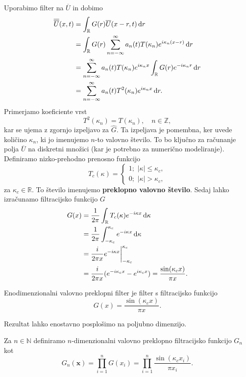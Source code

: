 \documentclass[mat2, tisk]{fmfdelo}
\newcommand{\R}{\mathbb R}
\newcommand{\N}{\mathbb N}
\newcommand{\Z}{\mathbb Z}
\newcommand{\bd}{\textbf}
\begin{document}
\noindent
Uporabimo filter na $\overline{U}$ in dobimo
\begin{align*}
\overline{\overline{U}}(x, t) &= \int_\R G(r) \overline{U}(x-r, t) \dif r \\
&= \int_\R G(r) \sum_{n=-\infty}^\infty a_n(t) T(\kappa_n) e^{i\kappa_n (x - r)} \dif r \\
&= \sum_{n=-\infty}^\infty a_n(t)T(\kappa_n) e^{i\kappa_n x} \int_\R G(r)e^{-i\kappa_n r} \dif r \\
&= \sum_{n=-\infty}^\infty a_n(t)T^2(\kappa_n) e^{i\kappa_n x} \dif r.
\end{align*}
Primerjamo koeficiente vrst
$$
T^2(\kappa_n) = T(\kappa_n), \quad n\in \Z,
$$
kar se ujema z zgornjo izpeljavo za $\hat{G}$. Ta izpeljava je pomembna, ker uvede količino 
$\kappa_n$, ki jo imenujemo $n$-to valovno število. To bo ključno za računanje 
polja $\overline{U}$ na diskretni množici (kar je potrebno za numerično modeliranje).
Definiramo nizko-prehodno prenosno funkcijo
$$
T_c(\kappa)=\left\{\begin{array}{l}
  1 ;\,\, |\kappa| \leq \kappa_c, \\
  0 ;\,\, |\kappa| > \kappa_c,
\end{array}\right.
$$
za $\kappa_c \in \R$. To število imenujemo \textbf{preklopno valovno število}. Sedaj lahko izračunamo 
filtracijsko funkcijo $G$
\begin{align*}
G(x) &= \frac{1}{2\pi} \int_\R T_c(\kappa) e^{-i\kappa x} \dif \kappa \\
&= \frac{1}{2\pi} \int_{-\kappa_c}^{\kappa_c} e^{-i\kappa x} \dif \kappa \\ 
&= \frac{i}{2\pi x} e^{-i\kappa x}\Big|_{-\kappa_c}^{\kappa_c}\\
&= \frac{i}{2\pi x} (e^{-i\kappa_c x} - e^{i\kappa_c x}) = \frac{\sin(\kappa_c x)}{\pi x}.
\end{align*} 

\begin{definicija}
Enodimenzionalni valovno preklopni filter je filter s filtracijsko funkcijo
\begin{equation*}
G(x) = \frac{\sin(\kappa_c x)}{\pi x}.
\end{equation*}
\end{definicija}
\noindent
Rezultat lahko enostavno posplošimo na poljubno dimenzijo.
\begin{definicija}
Za $n\in \N$ definiramo $n$-dimenzionalni valovno preklopno filtracijsko 
funkcijo $G_n$ kot
\begin{equation*}
G_n(\bd{x}) = \prod_{i=1}^n G(x_i) =\prod_{i=1}^n \frac{\sin(\kappa_c x_i)}{\pi x_i}.
\end{equation*} 
\end{definicija}
\end{document}
